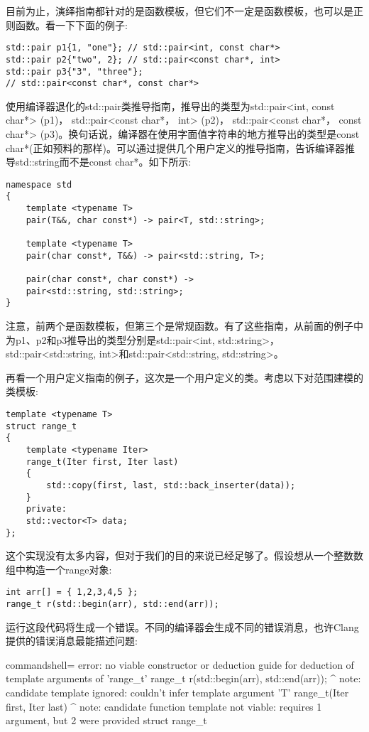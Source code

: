 目前为止，演绎指南都针对的是函数模板，但它们不一定是函数模板，也可以是正则函数。看一下下面的例子:

\begin{lstlisting}[style=styleCXX]
std::pair p1{1, "one"}; // std::pair<int, const char*>
std::pair p2{"two", 2}; // std::pair<const char*, int>
std::pair p3{"3", "three"};
// std::pair<const char*, const char*>
\end{lstlisting}

使用编译器退化的std::pair类推导指南，推导出的类型为std::pair<int, const char*> (p1)， std::pair<const char*， int> (p2)， std::pair<const char*， const char*> (p3)。换句话说，编译器在使用字面值字符串的地方推导出的类型是const char*(正如预料的那样)。可以通过提供几个用户定义的推导指南，告诉编译器推导std::string而不是const char*。如下所示:

\begin{lstlisting}[style=styleCXX]
namespace std
{
	template <typename T>
	pair(T&&, char const*) -> pair<T, std::string>;
	
	template <typename T>
	pair(char const*, T&&) -> pair<std::string, T>;
	
	pair(char const*, char const*) ->
	pair<std::string, std::string>;
}
\end{lstlisting}

注意，前两个是函数模板，但第三个是常规函数。有了这些指南，从前面的例子中为p1、p2和p3推导出的类型分别是std::pair<int, std::string>， std::pair<std::string, int>和std::pair<std::string, std::string>。

再看一个用户定义指南的例子，这次是一个用户定义的类。考虑以下对范围建模的类模板:

\begin{lstlisting}[style=styleCXX]
template <typename T>
struct range_t
{
	template <typename Iter>
	range_t(Iter first, Iter last)
	{
		std::copy(first, last, std::back_inserter(data));
	}
	private:
	std::vector<T> data;
};
\end{lstlisting}

这个实现没有太多内容，但对于我们的目的来说已经足够了。假设想从一个整数数组中构造一个range对象:

\begin{lstlisting}[style=styleCXX]
int arr[] = { 1,2,3,4,5 };
range_t r(std::begin(arr), std::end(arr));
\end{lstlisting}

运行这段代码将生成一个错误。不同的编译器会生成不同的错误消息，也许Clang提供的错误消息最能描述问题:

\begin{tcblisting}{commandshell={}}
error: no viable constructor or deduction guide for deduction
of template arguments of 'range_t'
range_t r(std::begin(arr), std::end(arr));
         ^
note: candidate template ignored: couldn't infer template
argument 'T'
range_t(Iter first, Iter last)
         ^
note: candidate function template not viable: requires 1
argument, but 2 were provided
struct range_t
\end{tcblisting}

